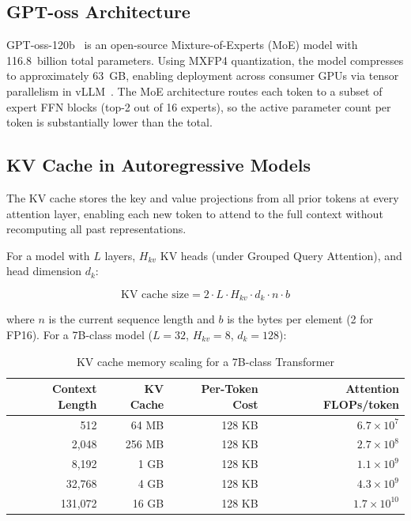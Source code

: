\documentclass[11pt,letterpaper]{article}
\begin{document}
\subsection{GPT-oss Architecture}

GPT-oss-120b~\cite{gptoss} is an open-source Mixture-of-Experts (MoE) model with 116.8~billion total parameters. Using MXFP4 quantization, the model compresses to approximately 63~GB, enabling deployment across consumer GPUs via tensor parallelism in vLLM~\cite{vllm}. The MoE architecture routes each token to a subset of expert FFN blocks (top-2 out of 16 experts), so the active parameter count per token is substantially lower than the total.

\subsection{KV Cache in Autoregressive Models}

The KV cache stores the key and value projections from all prior tokens at every attention layer, enabling each new token to attend to the full context without recomputing all past representations.

For a model with $L$ layers, $H_{kv}$ KV heads (under Grouped Query Attention), and head dimension $d_k$:

\begin{equation}
    \text{KV cache size} = 2 \cdot L \cdot H_{kv} \cdot d_k \cdot n \cdot b
    \label{eq:kv-cache}
\end{equation}

where $n$ is the current sequence length and $b$ is the bytes per element (2 for FP16). For a 7B-class model ($L=32$, $H_{kv}=8$, $d_k=128$):

\begin{table}[htbp]
\centering
\caption{KV cache memory scaling for a 7B-class Transformer}
\label{tab:kv-scaling}
\begin{tabular}{@{}rrrr@{}}
\toprule
\textbf{Context Length} & \textbf{KV Cache} & \textbf{Per-Token Cost} & \textbf{Attention FLOPs/token} \\
\midrule
512 & 64 MB & 128 KB & $6.7 \times 10^7$ \\
2,048 & 256 MB & 128 KB & $2.7 \times 10^8$ \\
8,192 & 1 GB & 128 KB & $1.1 \times 10^9$ \\
32,768 & 4 GB & 128 KB & $4.3 \times 10^9$ \\
131,072 & 16 GB & 128 KB & $1.7 \times 10^{10}$ \\
\bottomrule
\end{tabular}
\end{table}
\end{document}
